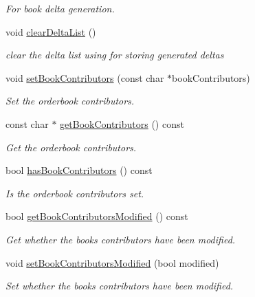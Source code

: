 \begin{CompactItemize}
\begin{CompactList}\small\item\em For book delta generation. \item\end{CompactList}\item 
void \hyperlink{classWombat_1_1MamdaOrderBook_5731f25e5419db8a45b16b34cc04480d}{clear\-Delta\-List} ()
\begin{CompactList}\small\item\em clear the delta list using for storing generated deltas \item\end{CompactList}\item 
void \hyperlink{classWombat_1_1MamdaOrderBook_1497ba3b8e8d9ad10e8329cf8eb5ad57}{set\-Book\-Contributors} (const char $\ast$book\-Contributors)
\begin{CompactList}\small\item\em Set the orderbook contributors. \item\end{CompactList}\item 
const char $\ast$ \hyperlink{classWombat_1_1MamdaOrderBook_18811f7038dde0b36fe946dbf1cb65c9}{get\-Book\-Contributors} () const 
\begin{CompactList}\small\item\em Get the orderbook contributors. \item\end{CompactList}\item 
bool \hyperlink{classWombat_1_1MamdaOrderBook_2af8676616a58763d82d6e9978c85814}{has\-Book\-Contributors} () const 
\begin{CompactList}\small\item\em Is the orderbook contributors set. \item\end{CompactList}\item 
bool \hyperlink{classWombat_1_1MamdaOrderBook_9b2b2ce6be6cabc94cd61ac911049206}{get\-Book\-Contributors\-Modified} () const 
\begin{CompactList}\small\item\em Get whether the books contributors have been modified. \item\end{CompactList}\item 
void \hyperlink{classWombat_1_1MamdaOrderBook_e1c1720e4858fc3f37addd9ce469b8aa}{set\-Book\-Contributors\-Modified} (bool modified)
\begin{CompactList}\small\item\em Set whether the books contributors have been modified. \item\end{CompactList}\end{CompactItemize}
